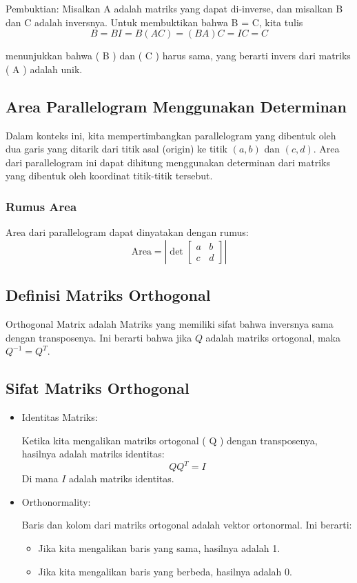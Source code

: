 \documentclass{article}
\begin{document}
Pembuktian:
Misalkan A adalah matriks yang dapat di-inverse, dan misalkan B dan C adalah inversnya. Untuk membuktikan bahwa B = C,
kita tulis
\[
    B = BI = B(AC) = (BA)C = IC = C
\]

menunjukkan bahwa ( B ) dan ( C ) harus sama, yang berarti invers dari matriks ( A ) adalah unik.

\subsection{Area Parallelogram Menggunakan Determinan}
Dalam konteks ini, kita mempertimbangkan parallelogram yang dibentuk oleh dua garis yang ditarik dari titik asal (origin) ke titik \( (a, b) \) dan \( (c, d) \). Area dari parallelogram ini dapat dihitung menggunakan determinan dari matriks yang dibentuk oleh koordinat titik-titik tersebut.

\subsubsection{Rumus Area}
Area dari parallelogram dapat dinyatakan dengan rumus: \[ \text{Area} = \left| \det \begin{bmatrix} a & b \\ c & d \end{bmatrix} \right| \]

\subsection{Definisi Matriks Orthogonal}
Orthogonal Matrix adalah Matriks yang memiliki sifat bahwa inversnya sama dengan transposenya. Ini berarti bahwa jika \( Q \) adalah matriks ortogonal, maka \( Q^{-1} = Q^T \).

\subsection{Sifat Matriks Orthogonal}
\begin{itemize}
    \item Identitas Matriks:

          Ketika kita mengalikan matriks ortogonal ( Q ) dengan transposenya, hasilnya adalah matriks identitas:
          \[
              Q Q^T = I
          \]
          Di mana \( I \) adalah matriks identitas.

    \item Orthonormality:

          Baris dan kolom dari matriks ortogonal adalah vektor ortonormal. Ini berarti:
          \begin{itemize}
              \item Jika kita mengalikan baris yang sama, hasilnya adalah 1.
              \item Jika kita mengalikan baris yang berbeda, hasilnya adalah 0.
          \end{itemize}
\end{itemize}
\end{document}
